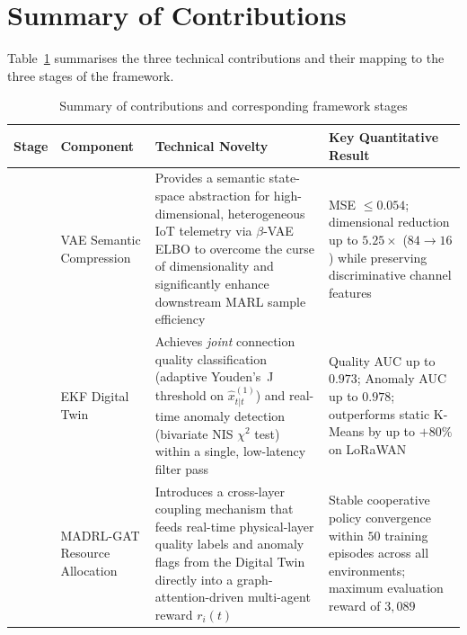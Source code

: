 \documentclass[12pt,a4paper]{article}
\begin{document}
\section{Summary of Contributions}
\label{sec:summary}

Table~\ref{tab:contrib} summarises the three technical contributions and
their mapping to the three stages of the framework.

\begin{table}[H]
\centering
\caption{Summary of contributions and corresponding framework stages}
\label{tab:contrib}
\setlength{\tabcolsep}{4pt}
\begin{tabular}{>{\raggedright\arraybackslash}p{}
                >{\raggedright\arraybackslash}p{}
                >{\raggedright\arraybackslash}p{}
                >{\raggedright\arraybackslash}p{}}
\toprule
\textbf{Stage} & \textbf{Component} & \textbf{Technical Novelty}
    & \textbf{Key Quantitative Result} \\
\midrule
1 & VAE Semantic Compression
  & Provides a semantic state-space abstraction for high-dimensional,
    heterogeneous IoT telemetry via $\beta$-VAE ELBO to overcome the
    curse of dimensionality and significantly enhance downstream
    MARL sample efficiency
  & MSE $\leq 0.054$; dimensional reduction up to $5.25\times$
    ($84\!\to\!16$) while preserving discriminative channel features \\
\midrule
2 & EKF Digital Twin
  & Achieves \textit{joint} connection quality classification
    (adaptive Youden's~J threshold on $\hat{x}^{(1)}_{t|t}$)
    and real-time anomaly detection (bivariate NIS $\chi^2$ test)
    within a single, low-latency filter pass
  & Quality AUC up to $0.973$; Anomaly AUC up to $0.978$;
    outperforms static K-Means by up to $+80\%$ on LoRaWAN \\
\midrule
3 & MADRL-GAT Resource Allocation
  & Introduces a cross-layer coupling mechanism that feeds
    real-time physical-layer quality labels and anomaly flags
    from the Digital Twin directly into a graph-attention-driven
    multi-agent reward $r_i(t)$
  & Stable cooperative policy convergence within $50$ training
    episodes across all environments; maximum evaluation reward
    of $3{,}089$ \\
\bottomrule
\end{tabular}
\end{table}
\end{document}
